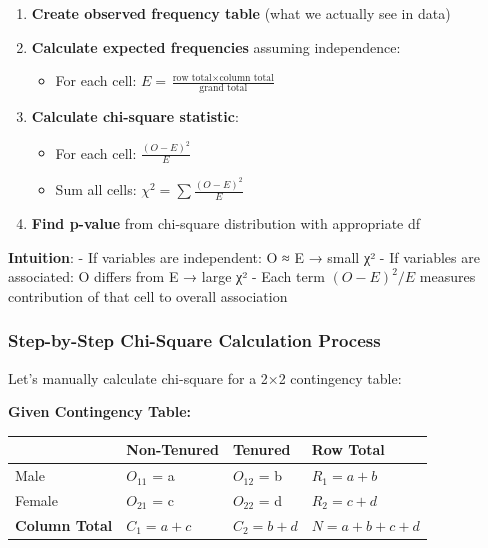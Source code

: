 \documentclass[11pt]{article}
\providecommand{\tightlist}{%
      \setlength{\itemsep}{0pt}\setlength{\parskip}{0pt}}
\begin{document}
\begin{enumerate}
\def\labelenumi{\arabic{enumi}.}
\tightlist
\item
  \textbf{Create observed frequency table} (what we actually see in
  data)
\item
  \textbf{Calculate expected frequencies} assuming independence:

  \begin{itemize}
  \tightlist
  \item
    For each cell:
    \(E = \frac{\text{row total} \times \text{column total}}{\text{grand total}}\)
  \end{itemize}
\item
  \textbf{Calculate chi-square statistic}:

  \begin{itemize}
  \tightlist
  \item
    For each cell: \(\frac{(O - E)^2}{E}\)
  \item
    Sum all cells: \(\chi^2 = \sum \frac{(O - E)^2}{E}\)
  \end{itemize}
\item
  \textbf{Find p-value} from chi-square distribution with appropriate df
\end{enumerate}

\textbf{Intuition}: - If variables are independent: O ≈ E → small χ² -
If variables are associated: O differs from E → large χ² - Each term
\((O-E)^2/E\) measures contribution of that cell to overall association

    \subsubsection{\texorpdfstring{\textbf{Step-by-Step Chi-Square
Calculation
Process}}{Step-by-Step Chi-Square Calculation Process}}\label{step-by-step-chi-square-calculation-process}

Let's manually calculate chi-square for a 2×2 contingency table:

\textbf{Given Contingency Table:}

\begin{longtable}[]{@{}llll@{}}
\toprule\noalign{}
& Non-Tenured & Tenured & Row Total \\
\midrule\noalign{}
\endhead
\bottomrule\noalign{}
\endlastfoot
Male & \(O_{11}\) = a & \(O_{12}\) = b & \(R_1 = a + b\) \\
Female & \(O_{21}\) = c & \(O_{22}\) = d & \(R_2 = c + d\) \\
\textbf{Column Total} & \(C_1 = a + c\) & \(C_2 = b + d\) &
\(N = a+b+c+d\) \\
\end{longtable}
\end{document}
